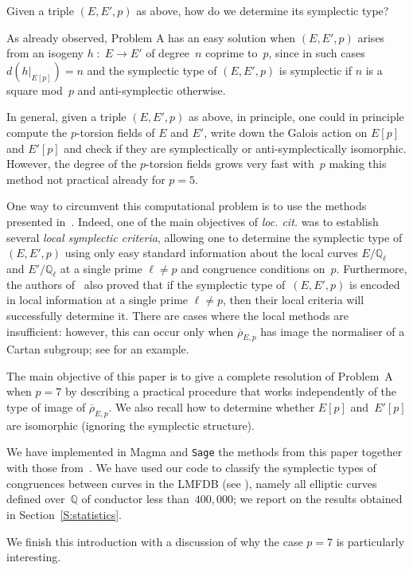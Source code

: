 \documentclass[12pt]{amsart}
\newcommand{\Q}{\mathbb{Q}}
\newcommand{\rhobar}{{\overline{\rho}}}
\numberwithin{equation}{section}
\theoremstyle{definition}
\theoremstyle{remark}
\newcommand{\Sage}{{\tt Sage}}
\newcommand{\Magma}{{\sc Magma}}
\begin{document}
Given a triple $(E,E',p)$ as above, how do we determine its symplectic type?

As already observed, Problem A has an easy solution when $(E,E',p)$
arises from an isogeny $h \; \colon \; E \to E'$ of degree~$n$ coprime
to~$p$, since in such cases $d(h|_{E[p]}) = n$ and the symplectic type
of $(E,E',p)$ is symplectic if $n$ is a square mod~$p$ and
anti-symplectic otherwise.

In general, given a triple $(E, E', p)$ as above, in principle, one
could in principle compute the $p$-torsion fields of $E$ and $E'$,
write down the Galois action on $E[p]$ and $E'[p]$ and check if they
are symplectically or anti-symplectically isomorphic. However, the
degree of the $p$-torsion fields grows very fast with~$p$ making this
method not practical already for $p = 5$.

One way to circumvent this computational problem is to use the methods
presented in~\cite{FKSym}. Indeed, one of the main objectives of {\it
  loc. cit.}  was to establish several {\it local symplectic
  criteria}, allowing one to determine the symplectic type of
$(E,E',p)$ using only easy standard information about the local curves
$E/\Q_\ell$ and $E'/\Q_\ell$ at a single prime $\ell \neq p$ and
congruence conditions on~$p$. Furthermore, the authors of~\cite{FKSym}
also proved that if the symplectic type of~$(E,E',p)$ is encoded in
local information at a single prime $\ell \neq p$, then their local
criteria will successfully determine it.  There are cases where the
local methods are insufficient: however, this can occur only when
$\rhobar_{E,p}$ has image the normaliser of a Cartan subgroup; see
\cite[Proposition~12]{FKSym} for an example.

The main objective of this paper is to give a complete resolution of
Problem~A when $p=7$ by describing a practical procedure that works
independently of the type of image of $\rhobar_{E,p}$.  We also recall
how to determine whether $E[p]$ and~$E'[p]$ are isomorphic (ignoring
the symplectic structure).

We have implemented in {\Magma} and {\Sage} the methods from this paper
together with those from~\cite{FKSym}. We have used our code to
classify the symplectic types of congruences between curves in the
LMFDB (see \cite{lmfdb}), namely all elliptic curves defined over~$\Q$
of conductor less than~$400,000$; we report on the results obtained in
Section~\ref{S:statistics}.


We finish this introduction with a discussion of why the case $p=7$ is particularly interesting. 
\end{document}
